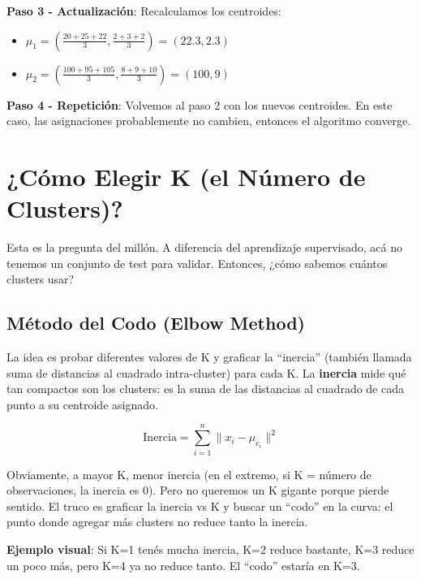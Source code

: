 \documentclass[12pt]{article}
\begin{document}
\vspace{0.5em}

\textbf{Paso 3 - Actualización}: Recalculamos los centroides:
\begin{itemize}
    \item $\mu_1 = \left(\frac{20+25+22}{3}, \frac{2+3+2}{3}\right) = (22.3, 2.3)$
    \item $\mu_2 = \left(\frac{100+95+105}{3}, \frac{8+9+10}{3}\right) = (100, 9)$
\end{itemize}

\vspace{0.5em}

\textbf{Paso 4 - Repetición}: Volvemos al paso 2 con los nuevos centroides. En este caso, las asignaciones probablemente no cambien, entonces el algoritmo converge.

\section{¿Cómo Elegir K (el Número de Clusters)?}

Esta es la pregunta del millón. A diferencia del aprendizaje supervisado, acá no tenemos un conjunto de test para validar. Entonces, ¿cómo sabemos cuántos clusters usar?

\subsection{Método del Codo (Elbow Method)}

La idea es probar diferentes valores de K y graficar la ``inercia'' (también llamada suma de distancias al cuadrado intra-cluster) para cada K. La \textbf{inercia} mide qué tan compactos son los clusters: es la suma de las distancias al cuadrado de cada punto a su centroide asignado.

\[
\text{Inercia} = \sum_{i=1}^{n} \|x_i - \mu_{c_i}\|^2
\]

Obviamente, a mayor K, menor inercia (en el extremo, si K = número de observaciones, la inercia es 0). Pero no queremos un K gigante porque pierde sentido. El truco es graficar la inercia vs K y buscar un ``codo'' en la curva: el punto donde agregar más clusters no reduce tanto la inercia.

\vspace{0.5em}

\textbf{Ejemplo visual}: Si K=1 tenés mucha inercia, K=2 reduce bastante, K=3 reduce un poco más, pero K=4 ya no reduce tanto. El ``codo'' estaría en K=3.
\end{document}
